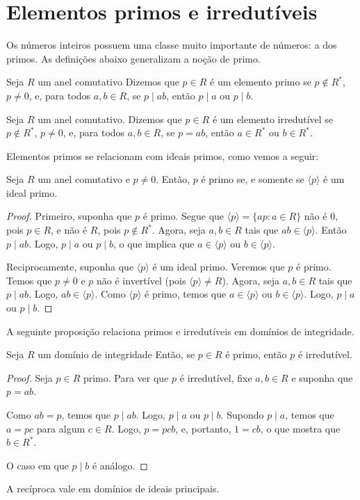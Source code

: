 \section{Elementos primos e irredutíveis}
Os números inteiros possuem uma classe muito importante de números: a dos primos.
As definições abaixo generalizam a noção de primo.

\begin{prop}
    Seja $R$ um anel comutativo
    Dizemos que $p \in R$ é um elemento primo se $p\notin R^*$, $p\neq 0$, e, para todos $a, b \in R$, se $p\mid ab$, então $p\mid a$ ou $p\mid b$.
\end{prop}

\begin{prop}
    Seja $R$ um anel comutativo.
    Dizemos que $p \in R$ é um elemento irredutível se $p\notin R^*$, $p\neq 0$, e, para todos $a, b \in R$, se $p=ab$, então $a\in R^*$ ou $b\in R^*$.
\end{prop}

Elementos primos se relacionam com ideais primos, como vemos a seguir:
\begin{prop}
    Seja $R$ um anel comutativo e $p\neq 0$.
    Então, $p$ é primo se, e somente se $\langle p\rangle$ é um ideal primo.
\end{prop}
\begin{proof}
    Primeiro, suponha que $p$ é primo.
    Segue que $\langle p\rangle=\{ap: a \in R\}$ não é $0$, pois $p \in R$, e não é $R$, pois $p\notin R^*$.
    Agora, seja $a, b \in R$ tais que $ab \in \langle p\rangle$.
    Então $p\mid ab$.
    Logo, $p\mid a$ ou $p\mid b$, o que implica que $a\in \langle p\rangle$ ou $b \in \langle p\rangle$.

    Reciprocamente, suponha que $\langle p\rangle$ é um ideal primo.
    Veremos que $p$ é primo.
    Temos que $p\neq 0$ e $p$ não é invertível (pois $\langle p\rangle\neq R$).
    Agora, seja $a, b \in R$ tais que $p\mid ab$.
    Logo, $ab \in \langle p\rangle$.
    Como $\langle p\rangle$ é primo, temos que $a \in \langle p\rangle$ ou $b \in \langle p\rangle$.
    Logo, $p\mid a$ ou $p\mid b$.
\end{proof}

A seguinte proposição relaciona primos e irredutíveis em domínios de integridade.

\begin{prop}
    Seja $R$ um domínio de integridade
    Então, se $p \in R$ é primo, então $p$ é irredutível.
\end{prop}
\begin{proof}
    Seja $p \in R$ primo.
    Para ver que $p$ é irredutível, fixe $a, b \in R$ e suponha que $p=ab$.
    
    Como $ab=p$, temos que $p\mid ab$.
    Logo, $p\mid a$ ou $p\mid b$.
    Supondo $p\mid a$, temos que $a=pc$ para algum $c \in R$.
    Logo, $p=pcb$, e, portanto, $1=cb$, o que mostra que $b \in R^*$.

    O caso em que $p\mid b$ é análogo.
\end{proof}
A recíproca vale em domínios de ideais principais.

